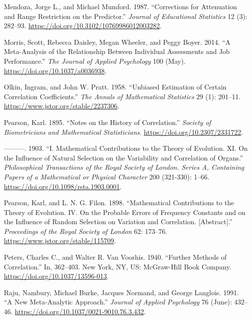 \documentclass[
  letterpaper,
  DIV=11,
  numbers=noendperiod]{scrreprt}
\newlength{\cslhangindent}
\newenvironment{CSLReferences}[2] %
 {\begin{list}{}{%
  \setlength{\itemindent}{0pt}
  \setlength{\leftmargin}{0pt}
  \setlength{\parsep}{0pt}
  \ifodd #1
   \setlength{\leftmargin}{\cslhangindent}
   \setlength{\itemindent}{-1\cslhangindent}
  \fi
  \setlength{\itemsep}{#2\baselineskip}}}
 {\end{list}}
\begin{document}
\begin{CSLReferences}{1}{0}
Mendoza, Jorge L., and Michael Mumford. 1987. {``Corrections for
Attenuation and Range Restriction on the Predictor.''} \emph{Journal of
Educational Statistics} 12 (3): 282--93.
\url{https://doi.org/10.3102/10769986012003282}.

Morris, Scott, Rebecca Daisley, Megan Wheeler, and Peggy Boyer. 2014.
{``A Meta-Analysis of the Relationship Between Individual Assessments
and Job Performance.''} \emph{The Journal of Applied Psychology} 100
(May). \url{https://doi.org/10.1037/a0036938}.

Olkin, Ingram, and John W. Pratt. 1958. {``Unbiased Estimation of
Certain Correlation Coefficients.''} \emph{The Annals of Mathematical
Statistics} 29 (1): 201--11. \url{https://www.jstor.org/stable/2237306}.

Pearson, Karl. 1895. {``Notes on the History of Correlation.''}
\emph{Society of Biometricians and Mathematical Statisticians}.
\url{https://doi.org/10.2307/2331722}.

---------. 1903. {``I. Mathematical Contributions to the Theory of
Evolution. {\textemdash}XI. On the Influence of Natural Selection on the
Variability and Correlation of Organs.''} \emph{Philosophical
Transactions of the Royal Society of London. Series A, Containing Papers
of a Mathematical or Physical Character} 200 (321-330): 1--66.
\url{https://doi.org/10.1098/rsta.1903.0001}.

Pearson, Karl, and L. N. G. Filon. 1898. {``Mathematical Contributions
to the Theory of Evolution. IV. On the Probable Errors of Frequency
Constants and on the Influence of Random Selection on Variation and
Correlation. {[}Abstract{]}.''} \emph{Proceedings of the Royal Society
of London} 62: 173--76. \url{https://www.jstor.org/stable/115709}.

Peters, Charles C., and Walter R. Van Voorhis. 1940. {``Further Methods
of Correlation.''} In, 362--403. New York, NY, US: McGraw-Hill Book
Company. \url{https://doi.org/10.1037/13596-013}.

Raju, Nambury, Michael Burke, Jacques Normand, and George Langlois.
1991. {``A New Meta-Analytic Approach.''} \emph{Journal of Applied
Psychology} 76 (June): 432--46.
\url{https://doi.org/10.1037/0021-9010.76.3.432}.


\end{CSLReferences}
\end{document}
